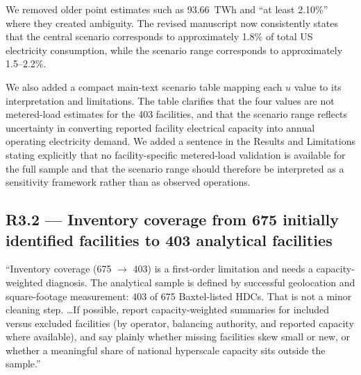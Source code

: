 \documentclass[11pt]{article}
\newenvironment{revquote}{%
  \begin{mdframed}[
    leftmargin=0.5em,
    rightmargin=0.5em,
    linewidth=0pt,
    backgroundcolor=gray!8,
    skipabove=0.5em,
    skipbelow=0.5em,
    innertopmargin=0.6em,
    innerbottommargin=0.6em,
    innerleftmargin=0.8em,
    innerrightmargin=0.8em
  ]%
  \itshape%
}{%
  \end{mdframed}%
}
\begin{document}
We removed older point estimates such as 93.66~TWh and ``at least 2.10\%'' where they created ambiguity. The revised manuscript now consistently states that the central scenario corresponds to approximately 1.8\% of total US electricity consumption, while the scenario range corresponds to approximately 1.5--2.2\%.

We also added a compact main-text scenario table mapping each $u$ value to its interpretation and limitations. The table clarifies that the four values are not metered-load estimates for the 403 facilities, and that the scenario range reflects uncertainty in converting reported facility electrical capacity into annual operating electricity demand. We added a sentence in the Results and Limitations stating explicitly that no facility-specific metered-load validation is available for the full sample and that the scenario range should therefore be interpreted as a sensitivity framework rather than as observed operations.

\subsection*{R3.2 --- Inventory coverage from 675 initially identified facilities to 403 analytical facilities}

\begin{revquote}
``Inventory coverage (675 $\rightarrow$ 403) is a first-order limitation and needs a capacity-weighted diagnosis. The analytical sample is defined by successful geolocation and square-footage measurement: 403 of 675 Baxtel-listed HDCs. That is not a minor cleaning step. \ldots If possible, report capacity-weighted summaries for included versus excluded facilities (by operator, balancing authority, and reported capacity where available), and say plainly whether missing facilities skew small or new, or whether a meaningful share of national hyperscale capacity sits outside the sample.''
\end{revquote}
\end{document}
